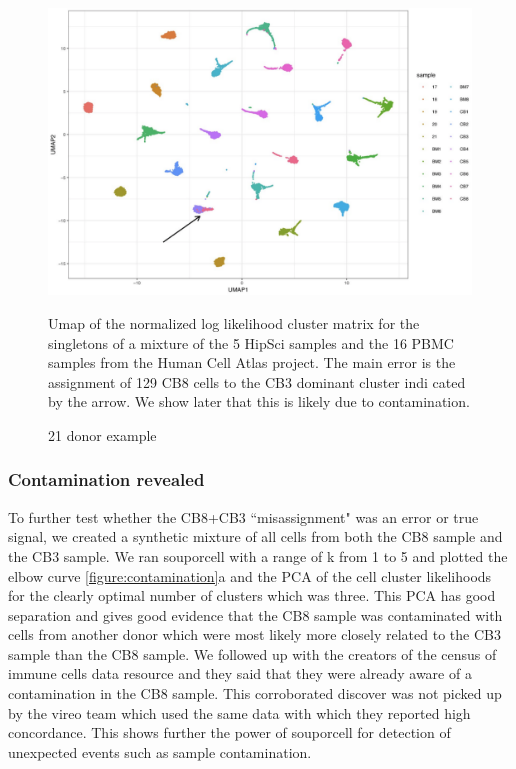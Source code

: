 \begin{figure}[htbp!]
\caption{21 donor example}
\label{figure:21donor}
\begin{centering}

\includegraphics[width=\textwidth]{21donor.png} 
\par{Umap of the normalized log likelihood cluster matrix for the singletons of a mixture of the 5 HipSci samples and the 16 PBMC
samples from the Human Cell Atlas project. The main error is the assignment of 129 CB8 cells to the CB3 dominant cluster indi cated by
the arrow. We show later that this is likely due to contamination.}

\end{centering}
\end{figure}

\subsubsection{Contamination revealed}

\par{
To further test whether the CB8+CB3 ``misassignment" was an error or true signal, we created a synthetic mixture of all cells from both the CB8 sample and the CB3 sample. We ran souporcell with a range of k from 1 to 5 and plotted the elbow curve \ref{figure:contamination}a and the PCA of the cell cluster likelihoods for the clearly optimal number of clusters which was three. This PCA has good separation and gives good evidence that the CB8 sample was contaminated with cells from another donor which were most likely more closely related to the CB3 sample than the CB8 sample. We followed up with the creators of the census of immune cells data resource and they said that they were already aware of a contamination in the CB8 sample. This corroborated discover was not picked up by the vireo team which used the same data with which they reported high concordance. This shows further the power of souporcell for detection of unexpected events such as sample contamination.
}

